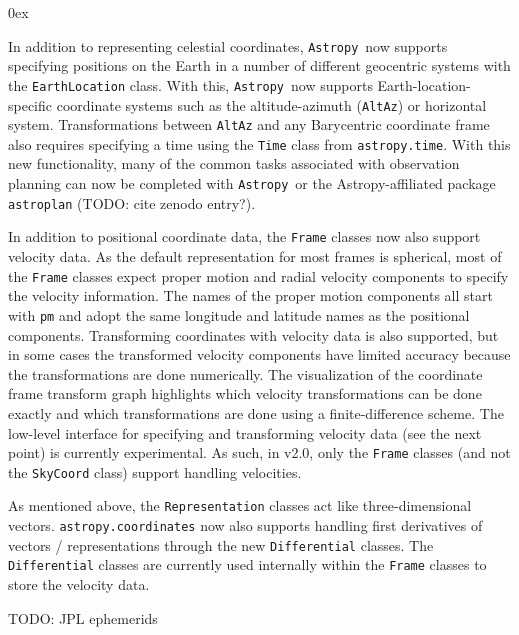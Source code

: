 \documentclass[modern]{aastex61}
\newcommand{\package}[1]{\texttt{#1}}
\newcommand{\astropy}{Astropy}
\newcommand{\astropypkg}{\package{Astropy}}
\begin{document}
\begin{description}\itemsep0ex
    \item[Local Earth coordinate frames] In addition to representing celestial
    coordinates, \astropypkg\ now supports specifying positions on the Earth in
    a number of different geocentric systems with the \texttt{EarthLocation}
    class.
    With this, \astropypkg\ now supports Earth-location-specific coordinate
    systems such as the altitude-azimuth (\texttt{AltAz}) or horizontal system.
    Transformations between \texttt{AltAz} and any Barycentric coordinate frame
    also requires specifying a time using the \texttt{Time} class from
    \texttt{astropy.time}.
    With this new functionality, many of the common tasks associated with
    observation planning can now be completed with \astropypkg\ or the
    \astropy-affiliated package \texttt{astroplan} (TODO: cite zenodo entry?).

    \item[Proper motion and velocity transformations]
    In addition to positional coordinate data, the \texttt{Frame} classes now
    also support velocity data.
    As the default representation for most frames is spherical, most of the
    \texttt{Frame} classes expect proper motion and radial velocity components
    to specify the velocity information.
    The names of the proper motion components all start with \texttt{pm} and
    adopt the same longitude and latitude names as the positional components.
    Transforming coordinates with velocity data is also supported, but in some
    cases the transformed velocity components have limited accuracy because the
    transformations are done numerically.
    The visualization of the coordinate frame transform graph highlights which
    velocity transformations can be done exactly and which transformations are
    done using a finite-difference scheme.
    The low-level interface for specifying and transforming velocity data (see
    the next point) is currently experimental.
    As such, in v2.0, only the \texttt{Frame} classes (and not the
    \texttt{SkyCoord} class) support handling velocities.

    \item[Derivatives of coordinate representations]
    As mentioned above, the \texttt{Representation} classes act like
    three-dimensional vectors.
    \texttt{astropy.coordinates} now also supports handling first derivatives of
    vectors / representations through the new \texttt{Differential} classes.
    The \texttt{Differential} classes are currently used internally within the
    \texttt{Frame} classes to store the velocity data.

    \item[JPL ephemeris]
    TODO: JPL ephemerids %
\end{description}
\end{document}
